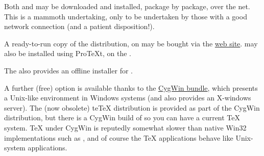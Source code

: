 Both \miktex{} and \texlive{} may be downloaded and installed, package
by package, over the net.  This is a mammoth undertaking, only to be
undertaken by those with a good network connection (and a patient
disposition!).

A ready-to-run copy of the \miktex{} distribution,
on  may be bought via the %
\href{http://www.miktex.org/cd/}{\miktex{} web site}.  \miktex{} may
also be installed using Pro\TeX{}t, on the %
.

The  also provides an
offline installer for \texlive{}.

%
%
%
%
  
A further (free) option is available thanks to the
\href{http://www.cygwin.com}{CygWin bundle}, which presents a
Unix-like environment in Windows systems (and also provides an
X-windows server).  The (now obsolete) te\TeX{} distribution is
provided as part of the CygWin distribution, but there is a CygWin
build of \texlive{} so you can have a current \TeX{} system.  \TeX{}
under CygWin is reputedly somewhat slower than native Win32
implementations such as \miktex{}, and of course the \TeX{}
applications behave like Unix-system applications.

